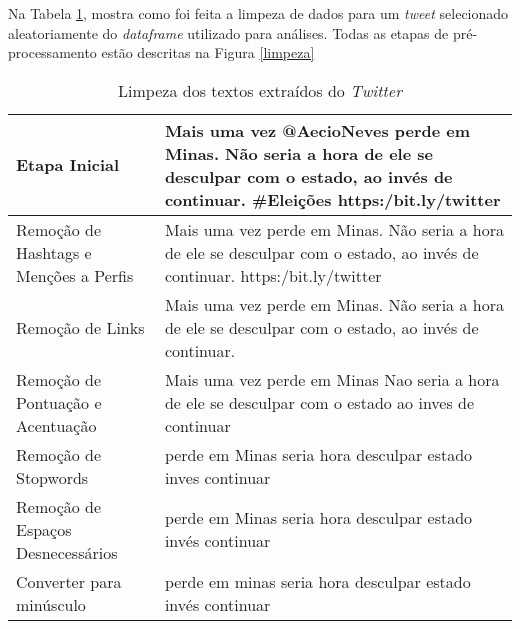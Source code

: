     Na Tabela \ref{tb:limpeza}, mostra como foi feita a limpeza de dados para um 
\textit{tweet} selecionado aleatoriamente do \textit{dataframe} utilizado para análises. Todas as etapas de pré-processamento
estão descritas na Figura \ref{limpeza}


\begin{table}
    \centering
    \caption{Limpeza dos textos extraídos do \textit{Twitter}}
    \label{tb:limpeza}
    
    \begin{tabular}{|l|p{8cm}|} 
    \hline
    Etapa Inicial       & Mais uma vez @AecioNeves perde em Minas.   Não seria a hora de ele se desculpar com o estado,   ao invés de continuar.  \#Eleições https:/bit.ly/twitter \\ \hline
    Remoção de Hashtags  e Menções a Perfis  & Mais uma vez    perde em Minas. Não seria a hora de ele se desculpar com o estado, ao invés de continuar. https:/bit.ly/twitter \\ \hline
    Remoção de Links                                                                  & Mais uma      vez perde em Minas. Não seria a hora de ele se desculpar com o estado, ao invés de continuar.   \\ \hline                                                                                                                                                    
    Remoção de Pontuação e  Acentuação                                               & Mais uma      vez perde em Minas Nao seria a hora de ele se desculpar com o estado ao inves de continuar  \\ \hline                                                                                                                                             
    Remoção de Stopwords                                                              & perde em Minas  seria  hora  desculpar  estado  inves continuar \\ \hline                                                                                                                                                                                         
    Remoção de Espaços Desnecessários                                             & perde em Minas seria hora desculpar estado invés continuar   \\ \hline                                                                                                                                                                                            
    Converter para minúsculo                                                          & perde em minas seria hora desculpar estado invés continuar  \\ \hline                                                                                                                                                                                                   
    \end{tabular}
    \end{table}



